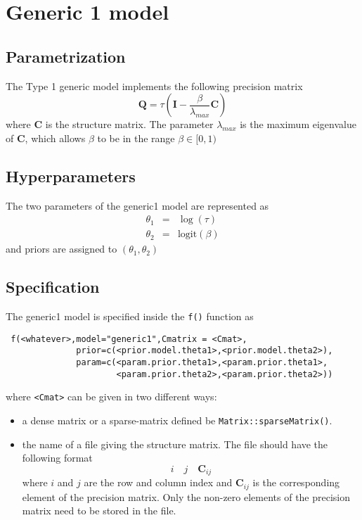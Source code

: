 \documentclass[a4paper,11pt]{article}
\begin{document}
\section*{Generic 1 model}

\subsection*{Parametrization}

The Type 1 generic model implements the following precision matrix
\[
\mathbf{Q}=\tau(\mathbf{I}-\frac{\beta}{\lambda_{max}}\mathbf{C})
\]
where $\mathbf{C}$ is the structure matrix. The parameter
$\lambda_{max}$ is the maximum eigenvalue of $\mathbf{C}$, which
allows $\beta$ to be in the range $\beta\in[0,1)$
\subsection*{Hyperparameters}

The two parameters of the generic1 model are represented as
\begin{eqnarray*}
    \theta_1 &= & \log(\tau)\\
    \theta_2 &=&\text{logit}(\beta)
\end{eqnarray*}
and priors are assigned to $(\theta_1,\theta_2)$

\subsection*{Specification}

The generic1 model is specified inside the {\tt f()} function as
\begin{verbatim}
 f(<whatever>,model="generic1",Cmatrix = <Cmat>,
              prior=c(<prior.model.theta1>,<prior.model.theta2>),
              param=c(<param.prior.theta1>,<param.prior.theta1>,
                      <param.prior.theta2>,<param.prior.theta2>))
\end{verbatim}
where {\tt <Cmat>} can be given in two different ways:
\begin{itemize}
\item a dense matrix or a sparse-matrix defined be
    \texttt{Matrix::sparseMatrix()}.
\item the name of a file giving the structure matrix. The file should
    have the following format
    \[
    i\quad j\quad \mathbf{C}_{ij}
    \]
    where $i$ and $j$ are the row and column index and
    $\mathbf{C}_{ij}$ is the corresponding element of the precision
    matrix. Only the non-zero elements of the precision matrix need to
    be stored in the file.
\end{itemize}
\end{document}
